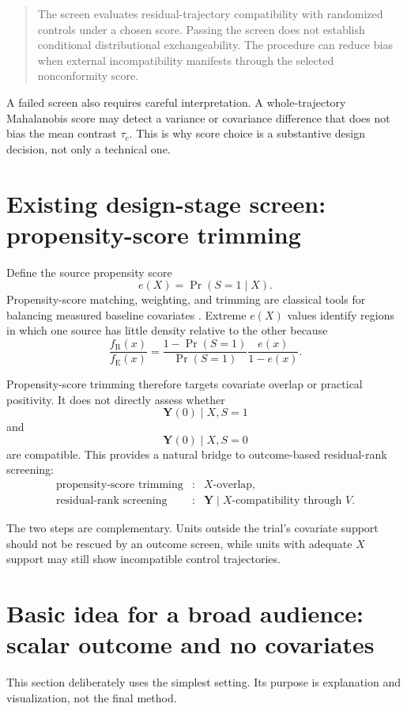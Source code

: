 \documentclass[11pt]{article}
\newcommand{\R}{\mathrm{R}}
\newcommand{\E}{\mathrm{E}}
\begin{document}
\begin{quote}
The screen evaluates residual-trajectory compatibility with randomized controls under a chosen score. Passing the screen does not establish conditional distributional exchangeability. The procedure can reduce bias when external incompatibility manifests through the selected nonconformity score.
\end{quote}

A failed screen also requires careful interpretation. A whole-trajectory Mahalanobis score may detect a variance or covariance difference that does not bias the mean contrast $\tau_c$. This is why score choice is a substantive design decision, not only a technical one.

\section{Existing design-stage screen: propensity-score trimming}

Define the source propensity score
\[
e(X)=\Pr(S=1\mid X).
\]
Propensity-score matching, weighting, and trimming are classical tools for balancing measured baseline covariates \citep{rosenbaum1983,crump2009}. Extreme $e(X)$ values identify regions in which one source has little density relative to the other because
\[
\frac{f_{\R}(x)}{f_{\E}(x)}
=
\frac{1-\Pr(S=1)}{\Pr(S=1)}
\frac{e(x)}{1-e(x)}.
\]

Propensity-score trimming therefore targets covariate overlap or practical positivity. It does not directly assess whether
\[
\bm Y(0)\mid X,S=1
\]
and
\[
\bm Y(0)\mid X,S=0
\]
are compatible. This provides a natural bridge to outcome-based residual-rank screening:
\[
\begin{array}{ccl}
\text{propensity-score trimming} &:& X\text{-overlap},\\[0.2em]
\text{residual-rank screening} &:& \bm Y\mid X\text{-compatibility through }V.
\end{array}
\]

The two steps are complementary. Units outside the trial's covariate support should not be rescued by an outcome screen, while units with adequate $X$ support may still show incompatible control trajectories.

\section{Basic idea for a broad audience: scalar outcome and no covariates}

This section deliberately uses the simplest setting. Its purpose is explanation and visualization, not the final method.
\end{document}
